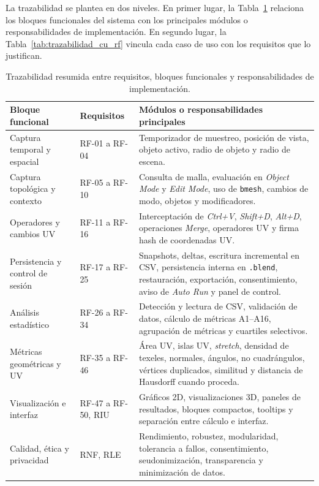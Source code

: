 La trazabilidad se plantea en dos niveles. En primer lugar, la Tabla~\ref{tab:trazabilidad_modulos} relaciona los bloques funcionales del sistema con los principales módulos o responsabilidades de implementación. En segundo lugar, la Tabla~\ref{tab:trazabilidad_cu_rf} vincula cada caso de uso con los requisitos que lo justifican.

\begin{table}[H]
\centering
\scriptsize
\begin{tabularx}{\textwidth}{p{3.1cm}p{3.0cm}X}
\toprule
\textbf{Bloque funcional} & \textbf{Requisitos} & \textbf{Módulos o responsabilidades principales} \\
\midrule
Captura temporal y espacial & RF-01 a RF-04 & Temporizador de muestreo, posición de vista, objeto activo, radio de objeto y radio de escena. \\
\midrule
Captura topológica y contexto & RF-05 a RF-10 & Consulta de malla, evaluación en \textit{Object Mode} y \textit{Edit Mode}, uso de \texttt{bmesh}, cambios de modo, objetos y modificadores. \\
\midrule
Operadores y cambios UV & RF-11 a RF-16 & Interceptación de \textit{Ctrl+V}, \textit{Shift+D}, \textit{Alt+D}, operaciones \textit{Merge}, operadores UV y firma hash de coordenadas UV. \\
\midrule
Persistencia y control de sesión & RF-17 a RF-25 & Snapshots, deltas, escritura incremental en CSV, persistencia interna en \texttt{.blend}, restauración, exportación, consentimiento, aviso de \textit{Auto Run} y panel de control. \\
\midrule
Análisis estadístico & RF-26 a RF-34 & Detección y lectura de CSV, validación de datos, cálculo de métricas A1--A16, agrupación de métricas y cuartiles selectivos. \\
\midrule
Métricas geométricas y UV & RF-35 a RF-46 & Área UV, islas UV, \textit{stretch}, densidad de texeles, normales, ángulos, no cuadrángulos, vértices duplicados, similitud y distancia de Hausdorff cuando proceda. \\
\midrule
Visualización e interfaz & RF-47 a RF-50, RIU & Gráficos 2D, visualizaciones 3D, paneles de resultados, bloques compactos, tooltips y separación entre cálculo e interfaz. \\
\midrule
Calidad, ética y privacidad & RNF, RLE & Rendimiento, robustez, modularidad, tolerancia a fallos, consentimiento, seudonimización, transparencia y minimización de datos. \\
\bottomrule
\end{tabularx}
\caption{Trazabilidad resumida entre requisitos, bloques funcionales y responsabilidades de implementación.}
\label{tab:trazabilidad_modulos}
\end{table}

